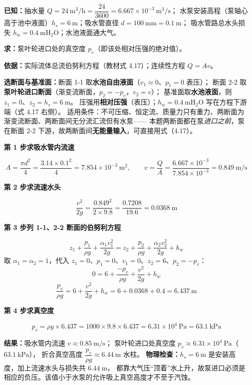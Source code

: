 \begin{jie}
\textbf{已知：}抽水量 $Q=24\ \mathrm{m^3/h}=\dfrac{24}{3600}=6.667\times10^{-3}\ \mathrm{m^3/s}$；
水泵安装高程（泵轴心高于池中液面）$h_s=6\ \mathrm{m}$；吸水管直径 $d=100\ \mathrm{mm}=0.1\ \mathrm{m}$；
吸水管路总水头损失 $h_w=0.4\ \mathrm{mH_2O}$；水池液面通大气。

\textbf{求：}泵叶轮进口处的真空度 $p_v$（即该处相对压强的绝对值）。

\textbf{依据：}实际流体总流伯努利方程（教材式 4.17）；连续性方程 $Q=Av$。

\textbf{选断面与基准面：}断面 1-1 取\textbf{水池自由液面}（$v_1\approx0$、$p_1=0$ 表压）；
断面 2-2 取\textbf{泵叶轮进口断面}（渐变流断面，$p_2=-p_v$，$v_2=v$）；
基准面取\textbf{水池液面}，则 $z_1=0$、$z_2=h_s=6\ \mathrm{m}$。
压强用\textbf{相对压强}（表压）；$h_w=0.4\ \mathrm{mH_2O}$ 写在方程下游端（式 4.17 右侧）。
适用条件：不可压缩、恒定流、质量力只有重力、两断面为渐变流断面、两断面间无分流汇流但有水泵——
本题两断面都在泵\emph{进口之前}，泵在断面 2-2 下游，故两断面间\textbf{无能量输入}，可直接用式（4.17）。

\textbf{第 1 步\quad 求吸水管内流速}

\[ A=\frac{\pi d^2}{4}=\frac{3.14\times0.1^2}{4}=7.854\times10^{-3}\ \mathrm{m^2},\qquad
   v=\frac{Q}{A}=\frac{6.667\times10^{-3}}{7.854\times10^{-3}}=0.849\ \mathrm{m/s} \]

\textbf{第 2 步\quad 求流速水头}

\[ \frac{v^2}{2g}=\frac{0.849^2}{2\times9.8}=\frac{0.7208}{19.6}=0.0368\ \mathrm{m} \]

\textbf{第 3 步\quad 列 1-1、2-2 断面的伯努利方程}

\[ z_1+\frac{p_1}{\rho g}+\frac{\alpha_1v_1^2}{2g}=z_2+\frac{p_2}{\rho g}+\frac{\alpha_2v_2^2}{2g}+h_w \]
取 $\alpha_1=\alpha_2=1$，代入 $z_1=0$、$p_1=0$、$v_1=0$、$z_2=6$、$p_2=-p_v$：
\[ 0=6+\frac{-p_v}{\rho g}+\frac{v^2}{2g}+h_w \]
\[ \frac{p_v}{\rho g}=6+\frac{v^2}{2g}+h_w=6+0.0368+0.4=6.437\ \mathrm{m} \]

\textbf{第 4 步\quad 求真空度}

\[ p_v=\rho g\times6.437=1000\times9.8\times6.437=6.31\times10^4\ \mathrm{Pa}=63.1\ \mathrm{kPa} \]

\textbf{结果：}吸水管内流速 $v\approx0.85\ \mathrm{m/s}$；
泵叶轮进口处真空度 $p_v\approx6.31\times10^4\ \mathrm{Pa}$（$63.1\ \mathrm{kPa}$），
折合真空高度 $\dfrac{p_v}{\rho g}\approx6.44\ \mathrm{m}$ 水柱。
\textbf{物理检查：}$h_s=6\ \mathrm{m}$ 是安装高度，加上流速水头与损失共 $6.44\ \mathrm{m}$，
都靠大气压“顶着”水上升，故泵进口必须是相应的负压。该值小于水泵的允许吸上真空高度才不至于汽蚀。
\end{jie}

